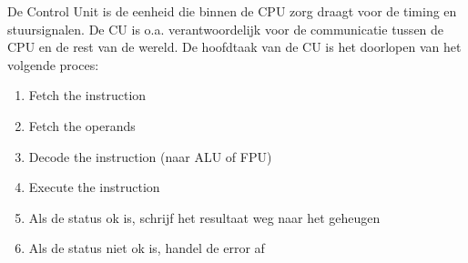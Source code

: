 De Control Unit is de eenheid die binnen de CPU zorg draagt voor de timing en stuursignalen. De CU is o.a. verantwoordelijk voor de communicatie tussen de CPU en de rest van de wereld. De hoofdtaak van de CU is het doorlopen van het volgende proces:
\begin{enumerate}
\item Fetch the instruction
\item Fetch the operands
\item Decode the instruction (naar ALU of FPU)
\item Execute the instruction
\item Als de status ok is, schrijf het resultaat weg naar het geheugen
\item Als de status niet ok is, handel de error af
\end{enumerate}

